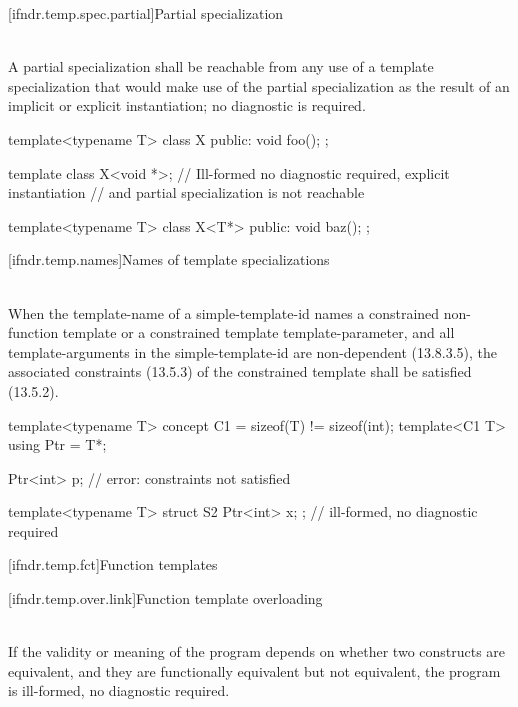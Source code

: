 [ifndr.temp.spec.partial]{Partial specialization}

\pnum
{} \\
A partial specialization shall be reachable from any use of a template specialization that would make use of the
partial specialization as the result of an implicit or explicit instantiation; no diagnostic is required.

\pnum
\begin{example}
\begin{codeblock}
template<typename T> class X{
public:
  void foo(){};
};

template class X<void *>; // Ill-formed no diagnostic required, explicit instantiation
                          // and partial specialization is not reachable

template<typename T> class X<T*>{
public:
  void baz();
};
\end{codeblock}
\end{example}


[ifndr.temp.names]{Names of template specializations}

\pnum
{} \\
When the template-name of a simple-template-id names a constrained non-function template or a constrained
template template-parameter, and all template-arguments in the simple-template-id are non-dependent (13.8.3.5),
the associated constraints (13.5.3) of the constrained template shall be satisfied (13.5.2).

\pnum
\begin{example}
\begin{codeblock}
template<typename T> concept C1 = sizeof(T) != sizeof(int);
template<C1 T> using Ptr = T*;

Ptr<int> p; // error: constraints not satisfied

template<typename T>
struct S2 { Ptr<int> x; }; // ill-formed, no diagnostic required
\end{codeblock}
\end{example}


[ifndr.temp.fct]{Function templates}

[ifndr.temp.over.link]{Function template overloading}

\pnum
{} \\
If the validity or meaning of the program depends on whether two constructs are equivalent, and they are
functionally equivalent but not equivalent, the program is ill-formed, no diagnostic required.

